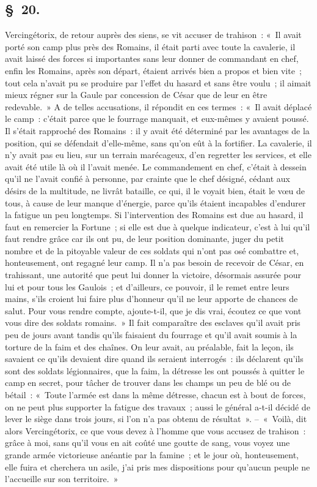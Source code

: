 \documentclass[french,twoside]{book} %
\begin{document}
\subsection[{§ 20.}]{ \textsc{§ 20.} }
\noindent Vercingétorix, de retour auprès des siens, se vit accuser de trahison : « Il avait porté son camp plus près des Romains, il était parti avec toute la cavalerie, il avait laissé des forces si importantes sans leur donner de commandant en chef, enfin les Romains, après son départ, étaient arrivés bien a propos et bien vite ; tout cela n’avait pu se produire par l’effet du hasard et sans être voulu ; il aimait mieux régner sur la Gaule par concession de César que de leur en être redevable. » A de telles accusations, il répondit en ces termes : « Il avait déplacé le camp : c’était parce que le fourrage manquait, et eux-mêmes y avaient poussé. Il s’était rapproché des Romains : il y avait été déterminé par les avantages de la position, qui se défendait d’elle-même, sans qu’on eût à la fortifier. La cavalerie, il n’y avait pas eu lieu, sur un terrain marécageux, d’en regretter les services, et elle avait été utile là où il l’avait menée. Le commandement en chef, c’était à dessein qu’il ne l’avait confié à personne, par crainte que le chef désigné, cédant aux désirs de la multitude, ne livrât bataille, ce qui, il le voyait bien, était le vœu de tous, à cause de leur manque d’énergie, parce qu’ils étaient incapables d’endurer la fatigue un peu longtemps. Si l’intervention des Romains est due au hasard, il faut en remercier la Fortune ; si elle est due à quelque indicateur, c’est à lui qu’il faut rendre grâce car ils ont pu, de leur position dominante, juger du petit nombre et de la pitoyable valeur de ces soldats qui n’ont pas osé combattre et, honteusement, ont regagné leur camp. Il n’a pas besoin de recevoir de César, en trahissant, une autorité que peut lui donner la victoire, désormais assurée pour lui et pour tous les Gaulois ; et d’ailleurs, ce pouvoir, il le remet entre leurs mains, s’ils croient lui faire plus d’honneur qu’il ne leur apporte de chances de salut. Pour vous rendre compte, ajoute-t-il, que je dis vrai, écoutez ce que vont vous dire des soldats romains. » Il fait comparaître des esclaves qu’il avait pris peu de jours avant tandis qu’ils faisaient du fourrage et qu’il avait soumis à la torture de la faim et des chaînes. On leur avait, au préalable, fait la leçon, ils savaient ce qu’ils devaient dire quand ils seraient interrogés : ils déclarent qu’ils sont des soldats légionnaires, que la faim, la détresse les ont poussés à quitter le camp en secret, pour tâcher de trouver dans les champs un peu de blé ou de bétail : « Toute l’armée est dans la même détresse, chacun est à bout de forces, on ne peut plus supporter la fatigue des travaux ; aussi le général a-t-il décidé de lever le siège dans trois jours, si l’on n’a pas obtenu de résultat ». – « Voilà, dit alors Vercingétorix, ce que vous devez à l’homme que vous accusez de trahison : grâce à moi, sans qu’il vous en ait coûté une goutte de sang, vous voyez une grande armée victorieuse anéantie par la famine ; et le jour où, honteusement, elle fuira et cherchera un asile, j’ai pris mes dispositions pour qu’aucun peuple ne l’accueille sur son territoire. »
\end{document}
